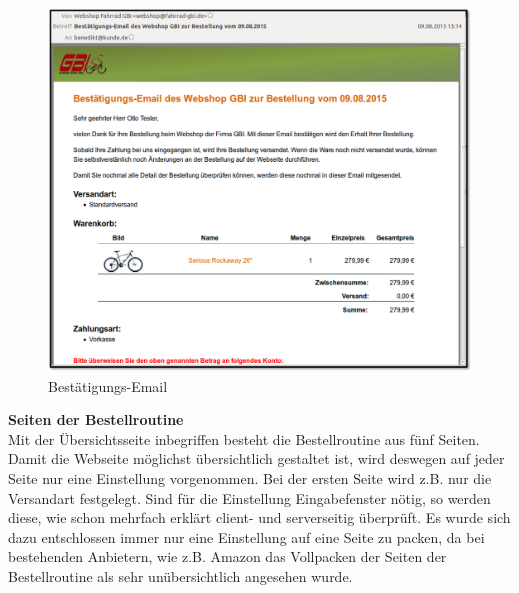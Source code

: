 \begin{figure}[H]
	\begin{center}
			\includegraphics[width=125mm]{Bilder/email.png}
	\end{center}
	\caption{Bestätigungs-Email}
\end{figure}

\textbf{Seiten der Bestellroutine}\\
Mit der Übersichtsseite inbegriffen besteht die Bestellroutine aus fünf Seiten. Damit die Webseite möglichst übersichtlich gestaltet ist, wird deswegen auf jeder Seite nur eine Einstellung vorgenommen. Bei der ersten Seite wird z.B. nur die Versandart festgelegt. Sind für die Einstellung Eingabefenster nötig, so werden diese, wie schon mehrfach erklärt client- und serverseitig überprüft. Es wurde sich dazu entschlossen immer nur eine Einstellung auf eine Seite zu packen, da bei bestehenden Anbietern, wie z.B. Amazon das \glqq Vollpacken\grqq{} der Seiten der Bestellroutine als sehr unübersichtlich angesehen wurde. 

